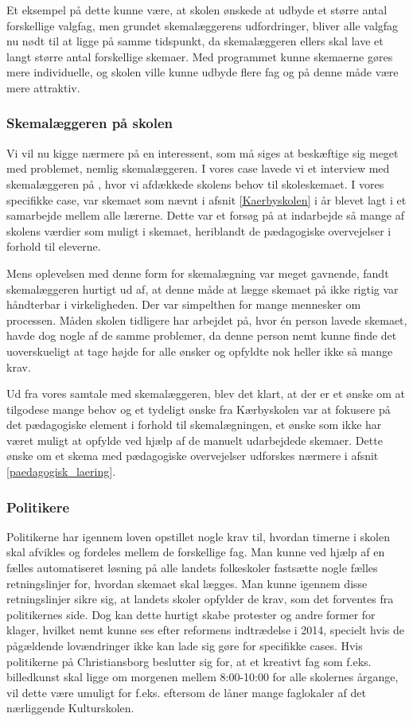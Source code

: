 Et eksempel på dette kunne være, at skolen ønskede at udbyde et større antal forskellige valgfag, men grundet skemalæggerens udfordringer, bliver alle valgfag nu nødt til at ligge på samme tidspunkt, da skemalæggeren ellers skal lave et langt større antal forskellige skemaer. Med programmet kunne skemaerne gøres mere individuelle, og skolen ville kunne udbyde flere fag og på denne måde være mere attraktiv.

\subsubsection{Skemalæggeren på skolen}
Vi vil nu kigge nærmere på en interessent, som må siges at beskæftige sig meget med problemet, nemlig skemalæggeren. I vores case lavede vi et interview med skemalæggeren på \school, hvor vi afdækkede skolens behov til skoleskemaet. I vores specifikke case, var skemaet som nævnt i afsnit \ref{Kaerbyskolen} i år blevet lagt i et samarbejde mellem alle lærerne. Dette var et forsøg på at indarbejde så mange af skolens værdier som muligt i skemaet, heriblandt de pædagogiske overvejelser i forhold til eleverne.

Mens oplevelsen med denne form for skemalægning var meget gavnende, fandt skemalæggeren hurtigt ud af, at denne måde at lægge skemaet på ikke rigtig var håndterbar i virkeligheden. Der var simpelthen for mange mennesker om processen. Måden skolen tidligere har arbejdet på, hvor \'en person lavede skemaet, havde dog nogle af de samme problemer, da denne person nemt kunne finde det uoverskueligt at tage højde for alle ønsker og opfyldte nok heller ikke så mange krav.

Ud fra vores samtale med skemalæggeren, blev det klart, at der er et ønske om at tilgodese mange behov og et tydeligt ønske fra Kærbyskolen var at fokusere på det pædagogiske element i forhold til skemalægningen, et ønske som ikke har været muligt at opfylde ved hjælp af de manuelt udarbejdede skemaer. Dette ønske om et skema med pædagogiske overvejelser udforskes nærmere i afsnit \ref{paedagogisk_laering}.

\subsubsection{Politikere}
Politikerne har igennem loven opstillet nogle krav til, hvordan timerne i skolen skal afvikles og fordeles mellem de forskellige fag. Man kunne ved hjælp af en fælles automatiseret løsning på alle landets folkeskoler fastsætte nogle fælles retningslinjer for, hvordan skemaet skal lægges. Man kunne igennem disse retningslinjer sikre sig, at landets skoler opfylder de krav, som det forventes fra politikernes side. Dog kan dette hurtigt skabe protester og andre former for klager, hvilket nemt kunne ses efter reformens indtrædelse i 2014\cite{LaererBrok}, specielt hvis de pågældende lovændringer ikke kan lade sig gøre for specifikke cases. Hvis politikerne på Christiansborg beslutter sig for, at et kreativt fag som f.eks. billedkunst skal ligge om morgenen mellem 8:00-10:00 for alle skolernes årgange, vil dette være umuligt for f.eks. \school eftersom de låner mange faglokaler af det nærliggende Kulturskolen\cite{interview_Kaerby}. 

